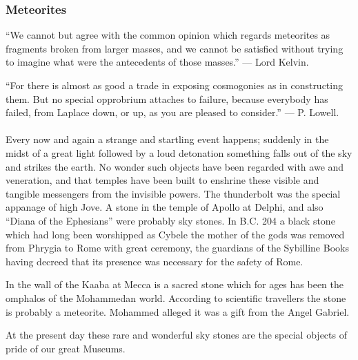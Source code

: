 \documentclass[a4paper, 12pt, oneside]{article}
\begin{document}
\subsubsection{Meteorites}
\begin{displayquote}
``We cannot but agree with the common opinion which regards meteorites as fragments broken from larger masses, and we cannot be satisfied without trying to imagine what were the antecedents of those masses.'' --- Lord Kelvin.
\end{displayquote}
\begin{displayquote}
``For there is almost as good a trade in exposing cosmogonies as in constructing them. But no special opprobrium attaches to failure, because everybody has failed, from Laplace down, or up, as you are pleased to consider.'' --- P. Lowell.
\end{displayquote}
\paragraph{}
Every now and again a strange and startling event happens; suddenly in the midst of a great light followed by a loud detonation something falls out of the sky and strikes the earth. No wonder such objects have been regarded with awe and veneration, and that temples have been built to enshrine these visible and tangible messengers from the invisible powers. The thunderbolt was the special appanage of high Jove. A stone in the temple of Apollo at Delphi, and also ``Diana of the Ephesians'' were probably sky stones. In B.C. 204 a black stone which had long been worshipped as Cybele the mother of the gods was removed from Phrygia to Rome with great ceremony, the guardians of the Sybilline Books having decreed that its presence was necessary for the safety of Rome.

In the wall of the Kaaba at Mecca is a sacred stone which for ages has been the omphalos of the Mohammedan world. According to scientific travellers the stone is probably a meteorite. Mohammed alleged it was a gift from the Angel Gabriel.

At the present day these rare and wonderful sky stones are the special objects of pride of our great Museums.
\end{document}
